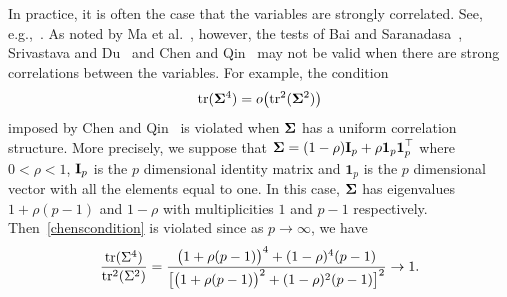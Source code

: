 \documentclass[times,sort&compress,3p]{elsarticle}
\newcommand{\mytr}{\rm tr}
\theoremstyle{plain}
\theoremstyle{definition}
\theoremstyle{remark}
\begin{document}
In practice, it is often the case that the variables are strongly correlated.
See, e.g.,~\cite{Chen2011A,Ma2015A,Thulin2014A}.
As noted by Ma {\rm et al.}~\cite{Ma2015A}, however, the tests of Bai and Saranadasa~\cite{Bai1996Efiect}, Srivastava and Du~\cite{Srivastava2008A} and Chen and Qin~\cite{Chen2010A} may not be valid when there are strong correlations between the variables.
For example, the condition 
\begin{equation}\label{chenscondition}
    \mathrm{tr}(\boldsymbol{\Sigma}^4)=o\big(\mathrm{tr}^2(\boldsymbol{\Sigma}^2)\big)
\end{equation}
imposed by Chen and Qin~\cite{Chen2010A} is violated when $\boldsymbol{\Sigma}$ has a uniform correlation structure.
More precisely, we suppose that
$\boldsymbol{\Sigma}=(1-\rho)\mathbf{I}_p+\rho\textbf{1}_p \textbf{1}_p^\top $ where $0<\rho<1$, $\mathbf{I}_p$ is the $p$ dimensional identity matrix and $\bm{1}_p$ is the $p$ dimensional vector with all the elements equal to one.
In this case, $\boldsymbol{\Sigma}$ has eigenvalues $1+\rho(p-1) $ and $1-\rho$ with multiplicities $1$ and $p-1$ respectively. Then~\eqref{chenscondition} is violated since 
as $p\to \infty$, we have
$$
\frac{\mytr (\bSigma^4)}{\mytr^2(\bSigma^2)}=\frac{\big(1+\rho(p-1)\big)^4 + (1-\rho)^4 (p-1)}{\big[ \big(1+\rho(p-1)\big)^2+(1-\rho)^2 (p-1) \big]^2}\to 1.
$$
\end{document}

